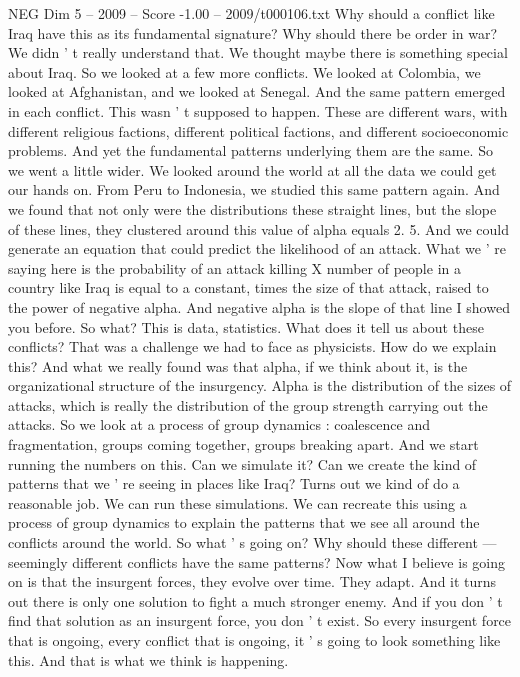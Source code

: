 \begin{textsample}{NEG Dim 5 – 2009 – Score -1.00 – 2009/t000106.txt}
Why should a conflict like Iraq have this as its fundamental signature?
Why should there be order in war?
We didn ' t really understand that.
We thought maybe there is something special about Iraq.
So we looked at a few more conflicts.
We looked at Colombia, we looked at Afghanistan, and we looked at Senegal.
And the same pattern emerged in each conflict.
This wasn ' t supposed to happen.
These are different wars, with different religious factions, different political factions, and different socioeconomic problems.
And yet the fundamental patterns underlying them are the same.
So we went a little wider.
We looked around the world at all the data we could get our hands on.
From Peru to Indonesia, we studied this same pattern again.
And we found that not only were the distributions these straight lines, but the slope of these lines, they clustered around this value of alpha equals 2. 5.
And we could generate an equation that could predict the likelihood of an attack.
What we ' re saying here is the probability of an attack killing X number of people in a country like Iraq is equal to a constant, times the size of that attack, raised to the power of negative alpha.
And negative alpha is the slope of that line I showed you before.
So what?
This is data, statistics.
What does it tell us about these conflicts?
That was a challenge we had to face as physicists.
How do we explain this?
And what we really found was that alpha, if we think about it, is the organizational structure of the insurgency.
Alpha is the distribution of the sizes of attacks, which is really the distribution of the group strength carrying out the attacks.
So we look at a process of group dynamics : coalescence and fragmentation, groups coming together, groups breaking apart.
And we start running the numbers on this.
Can we simulate it?
Can we create the kind of patterns that we ' re seeing in places like Iraq?
Turns out we kind of do a reasonable job.
We can run these simulations.
We can recreate this using a process of group dynamics to explain the patterns that we see all around the conflicts around the world.
So what ' s going on?
Why should these different — seemingly different conflicts have the same patterns?
Now what I believe is going on is that the insurgent forces, they evolve over time.
They adapt.
And it turns out there is only one solution to fight a much stronger enemy.
And if you don ' t find that solution as an insurgent force, you don ' t exist.
So every insurgent force that is ongoing, every conflict that is ongoing, it ' s going to look something like this.
And that is what we think is happening.

\end{textsample}

